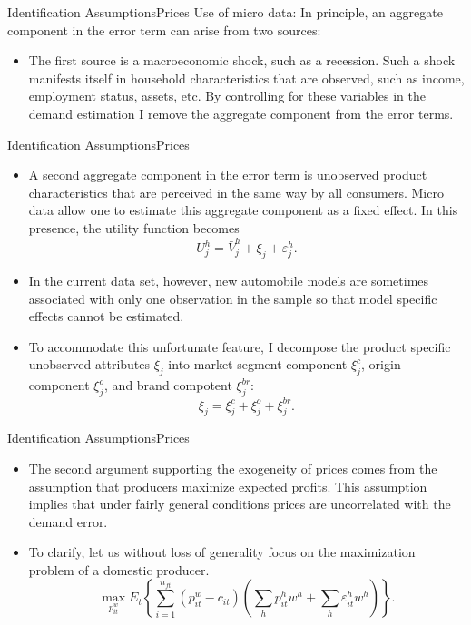 \documentclass{beamer}
\begin{document}
\begin{frame}{Identification Assumptions}{Prices}
	Use of micro data: In principle, an aggregate component in the error term can arise from two sources:
	\begin{itemize}
		\item The first source is a macroeconomic shock, such as a recession. Such a shock manifests itself in household characteristics that are observed, such as income, employment status, assets, etc. By controlling for these variables in the demand estimation I remove the aggregate component from the error terms.
	\end{itemize}
\end{frame}
\begin{frame}{Identification Assumptions}{Prices}
	\begin{itemize}
		\item A second aggregate component in the error term is unobserved product characteristics that are perceived in the same way by all consumers. Micro data allow one to estimate this aggregate component as a fixed effect. In this presence, the utility function becomes
		\begin{equation}
			U_j^h = \bar{V}_j^h + \xi_j + \varepsilon_j^h.
		\end{equation}
		\item In the current data set, however, new automobile models are sometimes associated with only one observation in the sample so that model specific effects cannot be estimated.
		\item To accommodate this unfortunate feature, I decompose the product specific unobserved attributes $\xi_j$ into market segment component $\xi_j^c$, origin component $\xi_j^o$, and brand compotent $\xi_j^{br}$:
		\begin{equation}
			\xi_j = \xi_j^c + \xi_j^o + \xi_j^{br}.
		\end{equation}
	\end{itemize}
\end{frame}
\begin{frame}{Identification Assumptions}{Prices}
	\begin{itemize}
		\item The second argument supporting the exogeneity of prices comes from the assumption that producers maximize expected profits. This assumption implies that under fairly general conditions prices are uncorrelated with the demand error.
		\item To clarify, let us without loss of generality focus on the maximization problem of a domestic producer.
		\begin{equation}
			\max_{p^w_{it}} E_t\left\{\sum_{i=1}^{n_{ft}}(p_{it}^w-c_{it})\left(\sum_h p_{it}^hw^h+\sum_h\varepsilon_{it}^hw^h\right) \right\}.
		\end{equation}
	\end{itemize}
\end{frame}
\end{document}
